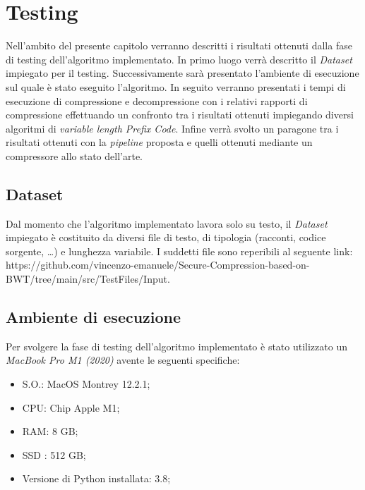 \chapter{Testing} 

\begin{citazione}
Nell'ambito del presente capitolo verranno descritti i risultati ottenuti dalla fase di testing dell'algoritmo implementato. In primo luogo verrà descritto il \emph{Dataset} impiegato per il testing. Successivamente sarà presentato l'ambiente di esecuzione sul quale è stato eseguito l'algoritmo. In seguito verranno presentati i tempi di esecuzione di compressione e decompressione con i relativi rapporti di compressione effettuando un confronto tra i risultati ottenuti impiegando diversi algoritmi di \emph{variable length Prefix Code}. Infine verrà svolto un paragone tra i risultati ottenuti con la \emph{pipeline} proposta e quelli ottenuti mediante un compressore allo stato dell'arte.
\end{citazione}
\newpage

\section{Dataset}
Dal momento che l'algoritmo implementato lavora solo su testo, il \emph{Dataset} impiegato è costituito da diversi file di testo, di tipologia (racconti, codice sorgente, \dots) e lunghezza variabile. I suddetti file sono reperibili al seguente link: https://github.com/vincenzo-emanuele/Secure-Compression-based-on-BWT/tree/main/src/TestFiles/Input. 
\section{Ambiente di esecuzione}
Per svolgere la fase di testing dell'algoritmo implementato è stato utilizzato un \emph{MacBook Pro M1 (2020)} avente le seguenti specifiche:
\begin{itemize}
    \item S.O.: MacOS Montrey 12.2.1;
    \item CPU: Chip Apple M1;
    \item RAM: 8 GB;
    \item SSD : 512 GB;
    \item Versione di Python installata: 3.8;
\end{itemize}
